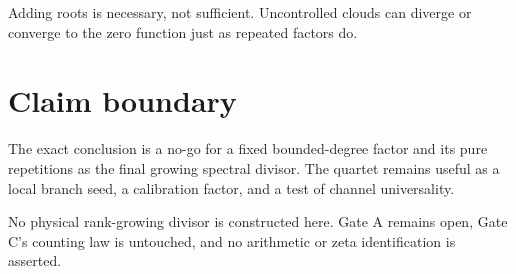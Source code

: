\documentclass[12pt]{article}
\theoremstyle{remark}\newtheorem{remark}[theorem]{Remark}
\begin{document}
Adding roots is necessary, not sufficient.  Uncontrolled clouds can diverge
or converge to the zero function just as repeated factors do.

\section{Claim boundary}

The exact conclusion is a no-go for a fixed bounded-degree factor and its
pure repetitions as the final growing spectral divisor.  The quartet remains
useful as a local branch seed, a calibration factor, and a test of channel
universality.

No physical rank-growing divisor is constructed here.  Gate A remains open,
Gate C's counting law is untouched, and no arithmetic or zeta identification
is asserted.


\end{document}
